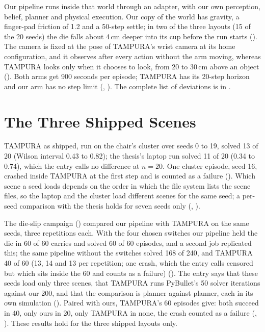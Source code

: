 Our pipeline runs inside that world through an adapter, with our own perception,
belief, planner and physical execution. Our copy of the world has gravity, a
finger-pad friction of 1.2 and a 50-step settle; in two of the three layouts (15 of
the 20 seeds) the die falls about 4\,cm deeper into its cup before the run starts
(). The camera is fixed at the pose
of TAMPURA's wrist camera at its home configuration, and it observes after every action
without the arm moving, whereas TAMPURA looks only when it chooses to look, from 20 to
30\,cm above an object (). Both arms get 900 seconds per episode;
TAMPURA has its 20-step horizon and our arm has no step limit (, ). The complete list
of deviations is in .

\section{The Three Shipped Scenes}
\label{sec:shipped}

TAMPURA as shipped, run on the chair's cluster over seeds 0 to 19, solved 13 of
20 (Wilson interval 0.43 to 0.82); the thesis's laptop run solved 11 of 20 (0.34
to 0.74), which the entry calls no difference at $n = 20$. One cluster episode, seed 16,
crashed inside TAMPURA at the first step and is counted as a failure ().
Which scene a seed loads depends on the order in which the file system lists the
scene files, so the laptop and the cluster load different scenes for the same
seed; a per-seed comparison with the thesis holds for seven seeds only (,
).

The die-slip campaign () compared our pipeline with
TAMPURA on the same seeds, three repetitions each. With the four chosen switches
our pipeline held the die in 60 of 60 carries and solved 60 of 60 episodes, and a
second job replicated this; the same pipeline without the switches solved 168 of
240, and TAMPURA 40 of 60 (13, 14 and 13 per repetition; one crash, which the entry
calls censored but which sits inside the 60 and counts as a failure) (). The entry says that these seeds load only three scenes, that TAMPURA runs
PyBullet's 50 solver iterations against our 200, and that the comparison is
planner against planner, each in its own simulation (). Paired with ours,
TAMPURA's 60 episodes give: both succeed in 40, only ours in 20, only TAMPURA in none,
the crash counted as a failure (, ). These results hold
for the three shipped layouts only. 

